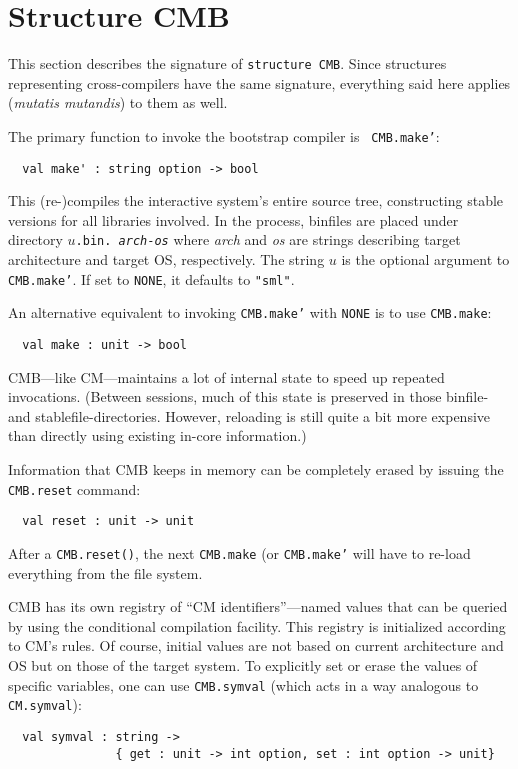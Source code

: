 
\section{Structure CMB}

This section describes the signature of {\tt structure CMB}.  Since
structures representing cross-compilers have the same signature,
everything said here applies ({\em mutatis mutandis}) to them as well.

The primary function to invoke the bootstrap compiler is {\tt
CMB.make'}:

\begin{verbatim}
  val make' : string option -> bool
\end{verbatim}

This (re-)compiles the interactive system's entire source tree,
constructing stable versions for all libraries involved.  In the
process, binfiles are placed under directory {\tt $u$.bin.{\it
arch}-{\it os}} where {\it arch} and {\it os} are strings describing
target architecture and target OS, respectively.  The string $u$ is
the optional argument to {\tt CMB.make'}.  If set to {\tt NONE}, it
defaults to \verb|"sml"|.

An alternative equivalent to invoking {\tt CMB.make'} with {\tt NONE}
is to use {\tt CMB.make}:

\begin{verbatim}
  val make : unit -> bool
\end{verbatim}

CMB---like CM---maintains a lot of internal state to speed up repeated
invocations.  (Between sessions, much of this state is preserved in
those binfile- and stablefile-directories.  However, reloading is
still quite a bit more expensive than directly using existing in-core
information.)

Information that CMB keeps in memory can be completely erased by
issuing the {\tt CMB.reset} command:

\begin{verbatim}
  val reset : unit -> unit
\end{verbatim}

After a {\tt CMB.reset()}, the next {\tt CMB.make} (or {\tt CMB.make'}
will have to re-load everything from the file system.

CMB has its own registry of ``CM identifiers''---named values that can
be queried by using the conditional compilation facility.  This
registry is initialized according to CM's rules. Of course, initial
values are not based on current architecture and OS but on those of the
target system.  To explicitly set or erase the values of specific
variables, one can use {\tt CMB.symval} (which acts in a way analogous
to {\tt CM.symval}):

\begin{verbatim}
  val symval : string ->
               { get : unit -> int option, set : int option -> unit}
\end{verbatim}
